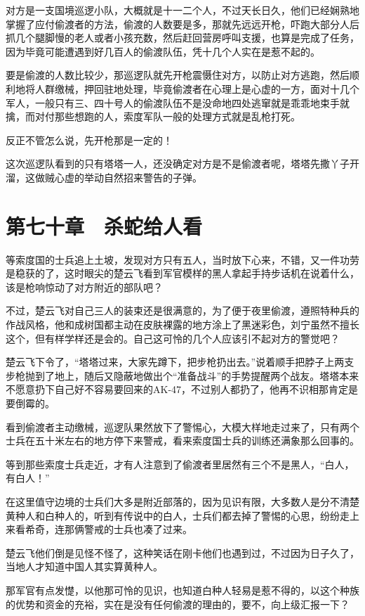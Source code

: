 对方是一支国境巡逻小队，大概就是十一二个人，不过天长日久，他们已经娴熟地掌握了应付偷渡者的方法，偷渡的人数要是多，那就先远远开枪，吓跑大部分人后抓几个腿脚慢的老人或者小孩充数，然后赶回营房呼叫支援，也算是完成了任务，因为毕竟可能遭遇到好几百人的偷渡队伍，凭十几个人实在是惹不起的。

要是偷渡的人数比较少，那巡逻队就先开枪震慑住对方，以防止对方逃跑，然后顺利地将人群缴械，押回驻地处理，毕竟偷渡者在心理上是心虚的一方，面对十几个军人，一般只有三、四十号人的偷渡队伍不是没命地四处逃窜就是乖乖地束手就擒，而对付那些想跑的人，索度军队一般的处理方式就是乱枪打死。

反正不管怎么说，先开枪那是一定的！

这次巡逻队看到的只有塔塔一人，还没确定对方是不是偷渡者呢，塔塔先撒丫子开溜，这做贼心虚的举动自然招来警告的子弹。

\section{第七十章　杀蛇给人看}

等索度国的士兵追上土坡，发现对方只有五人，当时放下心来，不错，又一件功劳是稳获的了，这时眼尖的楚云飞看到军官模样的黑人拿起手持步话机在说着什么，该是枪响惊动了对方附近的部队吧？

不过，楚云飞对自己三人的装束还是很满意的，为了便于夜里偷渡，遵照特种兵的作战风格，他和成树国都主动在皮肤裸露的地方涂上了黑迷彩色，刘宁虽然不擅长这个，但有样学样还是会的。自己这可怜的几个人应该引不起对方的警觉吧？

楚云飞下令了，“塔塔过来，大家先蹲下，把步枪扔出去。”说着顺手把脖子上两支步枪抛到了地上，随后又隐蔽地做出个“准备战斗”的手势提醒两个战友。塔塔本来不愿意扔下自己好不容易要回来的AK-47，不过别人都扔了，他再不识相那肯定是要倒霉的。

看到偷渡者主动缴械，巡逻队果然放下了警惕心，大模大样地走过来了，只有两个士兵在五十米左右的地方停下来警戒，看来索度国士兵的训练还满象那么回事的。

等到那些索度士兵走近，才有人注意到了偷渡者里居然有三个不是黑人，“白人，有白人！”

在这里值守边境的士兵们大多是附近部落的，因为见识有限，大多数人是分不清楚黄种人和白种人的，听到有传说中的白人，士兵们都去掉了警惕的心思，纷纷走上来看希奇，连那俩警戒的士兵也凑了过来。

楚云飞他们倒是见怪不怪了，这种笑话在刚卡他们也遇到过，不过因为日子久了，当地人才知道中国人其实算黄种人。

那军官有点发憷，以他那可怜的见识，也知道白种人轻易是惹不得的，以这个种族的优势和资金的充裕，实在是没有任何偷渡的理由的，要不，向上级汇报一下？

